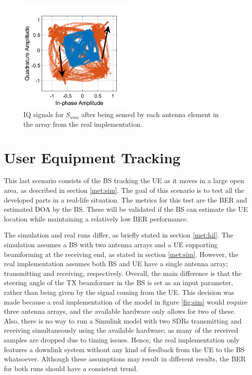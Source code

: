 \documentclass[12pt,a4paper]{report}
\begin{document}
\begin{figure}[h]
    \centering
    \includegraphics[width = 0.5\textwidth]{Figures/test_bf_doa_rx.png}
    \caption[Constellation diagram of the signal sensed by the RX antenna array.]{IQ signals for $S_{wan}$ after being sensed by each antenna element in the array from the real implementation.}
    \label{fig:test:bf:doa:rx}
\end{figure}

\newpage
\section{User Equipment Tracking} \label{test:ue}
 This last scenario consists of the BS tracking the UE as it moves in a large open area, as described in section \ref{met:sim}. The goal of this scenario is to test all the developed parts in a real-life situation. The metrics for this test are the BER and estimated DOA by the BS. These will be validated if the BS can estimate the UE location while maintaining a relatively low BER performance.
 
 The simulation and real runs differ, as briefly stated in section \ref{met:hil}. The simulation assumes a BS with two antenna arrays and a UE supporting beamforming at the receiving end, as stated in section \ref{met:sim}. However, the real implementation assumes both BS and UE have a single antenna array; transmitting and receiving, respectively. Overall, the main difference is that the steering angle of the TX beamformer in the BS is set as an input parameter, rather than being given by the signal coming from the UE. This decision was made because a real implementation of the model in figure \ref{fig:sim} would require three antenna arrays, and the available hardware only allows for two of these. Also, there is no way to run a Simulink model with two SDRs transmitting and receiving simultaneously using the available hardware; as many of the received samples are dropped due to timing issues. Hence, the real implementation only features a downlink system without any kind of feedback from the UE to the BS whatsoever. Although these assumptions may result in different results, the BER for both runs should have a consistent trend. 
 
\end{document}
